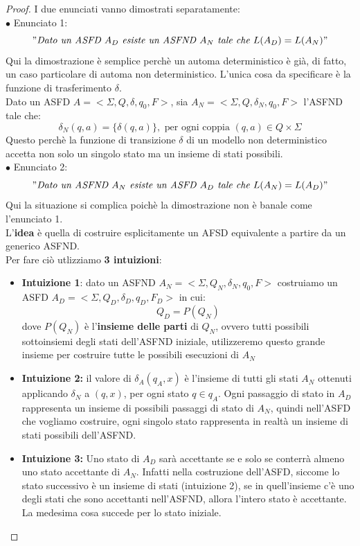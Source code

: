 \begin{proof}
    I due enunciati vanno dimostrati separatamente:\smallskip\\
    $\bullet$ Enunciato 1: 
    \["\textit{Dato un ASFD $A_D$ esiste un ASFND $A_N$ tale che $L(A_D) = L(A_N)$}  "\]
    Qui la dimostrazione è semplice perchè un automa deterministico è già, di fatto, un caso particolare di automa non deterministico. L'unica cosa da specificare è la funzione di trasferimento $\delta$.\smallskip\\
    Dato un ASFD $A = < \Sigma, Q, \delta, q_0, F >$, sia $A_N =< \Sigma, Q, \delta_N, q_0, F >$ l’ASFND tale che:
    \[ \delta_N (q,a)  = \{ \delta (q,a) \}, \text{ per ogni coppia } (q,a)\in Q \times \Sigma\]
    Questo perchè la funzione di transizione $\delta$ di un modello non deterministico accetta non solo un singolo stato ma un insieme di stati possibili.\medskip\\

    \noindent $\bullet$ Enunciato 2:
    \["\textit{Dato un ASFND $A_N$ esiste un ASFD $A_D$ tale che $L(A_N) = L(A_D)$}  "\]
    Qui la situazione si complica poichè la dimostrazione non è banale come l'enunciato 1.\\ 
    L'\textbf{idea} è quella di costruire esplicitamente un AFSD equivalente a partire da un generico ASFND.\smallskip\\
    Per fare ciò utlizziamo \textbf{3 intuizioni}:
    \begin{itemize}[label = --]
        \item \textbf{Intuizione 1}: dato un ASFND $A_N = <\Sigma, Q_N,\delta_N,q_0,F>$ costruiamo un ASFD $A_D = <\Sigma, Q_D,\delta_D,q_D,F_D>$ in cui:
        \[   Q_D = P(Q_N)   \]
        dove $P(Q_N)$ è l'\textbf{insieme delle parti} di $Q_N$, ovvero tutti possibili sottoinsiemi degli stati dell'ASFND iniziale, utilizzeremo questo grande insieme per costruire tutte le possibili esecuzioni di $A_N$
        \item \textbf{Intuizione 2:} il valore di $\delta_A(q_A,x)$ è l'insieme di tutti gli stati $A_N$ ottenuti applicando $\delta_N$ a $(q,x)$, per ogni stato $q\in q_A$. Ogni passaggio di stato in $A_D$ rappresenta 
        un insieme di possibili passaggi di stato di $A_N$, quindi nell'ASFD che vogliamo costruire, ogni singolo stato rappresenta in realtà un insieme di stati possibili dell’ASFND.

        \item \textbf{Intuizione 3:} Uno stato di $A_D$ sarà accettante se e solo se conterrà almeno uno stato accettante di $A_N$. Infatti nella costruzione dell'ASFD, siccome lo stato successivo è un insieme di stati (intuizione 2),
        se in quell'insieme c'è uno degli stati che sono accettanti nell'ASFND, allora l'intero stato è accettante. La medesima cosa succede per lo stato iniziale.




\end{itemize}
\end{proof}
